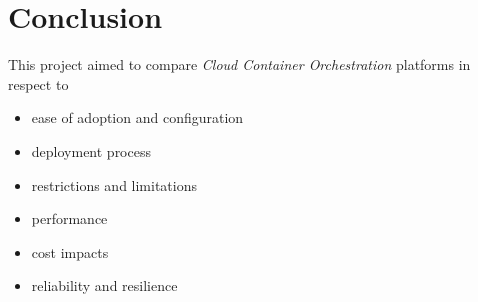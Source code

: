 \chapter{Conclusion}

This project aimed to compare \emph{Cloud Container Orchestration} platforms in respect to
\begin{itemize}
      \item ease of adoption and configuration
      \item deployment process
      \item restrictions and limitations
      \item performance
      \item cost impacts
      \item reliability and resilience
\end{itemize}

